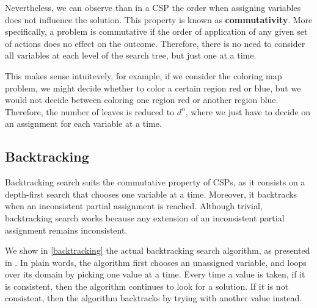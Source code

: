 Nevertheless, we can observe than in a CSP the order when assigning variables does not influence the solution.
This property is known as \textbf{commutativity}.
More specifically, a problem is commutative if the order of application of any given set of actions does no effect on the outcome.
Therefore, there is no need to consider all variables at each level of the search tree, but just one at a time.

This makes sense intuitevely, for example, if we consider the coloring map problem, we might decide whether to color a certain region red or blue, but we would not decide between coloring one region red or another region blue.
Therefore, the number of leaves is reduced to $d^n$, where we just have to decide on an assignment for each variable at a time.

\subsection{Backtracking}

Backtracking search suits the commutative property of CSPs, as it consists on a depth-first search that chooses one variable at a time.
Moreover, it backtracks when an inconsistent partial assignment is reached.
Although trivial, backtracking search works because any extension of an inconsistent partial assignment remains inconsistent.

We show in \ref{backtracking} the actual backtracking search algorithm, as presented in \cite{russell2016artificial}.
In plain words, the algorithm first chooses an unassigned variable, and loops over its domain by picking one value at a time.
Every time a value is taken, if it is consistent, then the algorithm continues to look for a solution.
If it is not consistent, then the algorithm backtracks by trying with another value instead.

